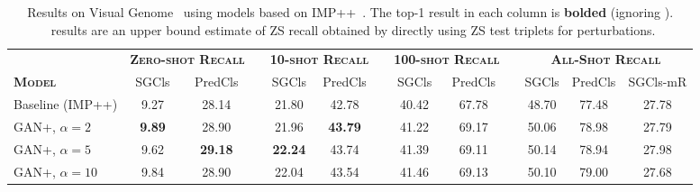 \begin{table}[tbhp]
	\setlength{\tabcolsep}{0.5pt}
	\tiny
	\centering
	\begin{center}
		\caption{\small Results on Visual Genome~\citep{krishna2017visual} using models based on IMP++~\citep{knyazev2020graph}. The top-1 result in each column is \textbf{bolded} (ignoring \oracle). \oracle~results are an upper bound estimate of ZS recall obtained by directly using ZS test triplets for perturbations. }
		\label{table:iccv_main_results}
		\vspace{-2pt}
		\begin{tabular}{l|c|cp{0.1cm}|c|cp{0.1cm}|c|cp{0.1cm}|c|c|c}
			\toprule
			& \multicolumn{2}{c}{\textsc{\textbf{Zero-shot Recall}}} & &
			\multicolumn{2}{c}{\textsc{\textbf{10-shot Recall}}} & &
			\multicolumn{2}{c}{\textsc{\textbf{100-shot Recall}}} & & 
			\multicolumn{3}{c}{\textsc{\textbf{All-Shot Recall}}}\Tstrut\Bstrut\\
			\textsc{\textbf{Model}} &
			\multicolumn{1}{c}{\scriptsize{SGCls}} & \multicolumn{1}{c}{\scriptsize{PredCls}} & &
			\multicolumn{1}{c}{\scriptsize{SGCls}} & \multicolumn{1}{c}{\scriptsize{PredCls}} & & \multicolumn{1}{c}{\scriptsize{SGCls}} & \multicolumn{1}{c}{\scriptsize{PredCls}} & & \multicolumn{1}{c}{\scriptsize{SGCls}} & \multicolumn{1}{c}{\scriptsize{PredCls}} &  \multicolumn{1}{c}{\scriptsize{SGCls-mR}}\\
			\cline{1-3}\cline{5-6}\cline{8-9}\cline{11-13}
			Baseline (IMP++) & 9.27\std{0.10} & 28.14\std{0.05} & & 21.80\std{0.19} & 42.78\std{0.32} & & 40.42\std{0.02} & 67.78\std{0.07} & & 48.70\std{0.08} & 77.48\std{0.09} & 27.78\std{0.10}\Tstrut\Bstrut\\

			GAN+\structn, $\alpha=2$ & \textbf{9.89}\std{0.15} & 28.90\std{0.14} & & 21.96\std{0.30} & \textbf{43.79}\std{0.27} & & 41.22\std{0.33} & 69.17\std{0.24} & & 50.06\std{0.29} & 78.98\std{0.09} & 27.79\std{0.48}\\
			
			GAN+\structn, $\alpha=5$ & 9.62\std{0.29} & \textbf{29.18}\std{0.33} & & \textbf{22.24}\std{0.11} & 43.74\std{0.10} & & 41.39\std{0.26} & 69.11\std{0.05} & & 50.14\std{0.21} & 78.94\std{0.03} & 27.98\std{0.23}\\
			
			GAN+\structn, $\alpha=10$ & 9.84\std{0.17} & 28.90\std{0.46} & & 22.04\std{0.33} & 43.54\std{0.36} & & 41.46\std{0.15} & 69.13\std{0.24} & & 50.10\std{0.23} & 79.00\std{0.09} & 27.68\std{0.37}\\
			

\end{tabular}
\end{center}
\end{table}
